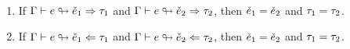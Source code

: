 \documentclass{article}
\begin{document}
\begin{theorem}[name=Unicity] \
  \begin{enumerate}[label=(\arabic*)]
    \item If $\Gamma \vdash e \looparrowright \check{e}_1 \Rightarrow \tau_1$ and
      $\Gamma \vdash e \looparrowright \check{e}_2 \Rightarrow \tau_2$, then $\check{e}_1 = \check{e}_2$ and $\tau_1 =
      \tau_2$.
    \item If $\Gamma \vdash e \looparrowright \check{e}_1 \Leftarrow \tau_1$ and
      $\Gamma \vdash e \looparrowright \check{e}_2 \Leftarrow \tau_2$, then $\check{e}_1 = \check{e}_2$ and $\tau_1 =
      \tau_2$.
  \end{enumerate}
\end{theorem}
\end{document}
